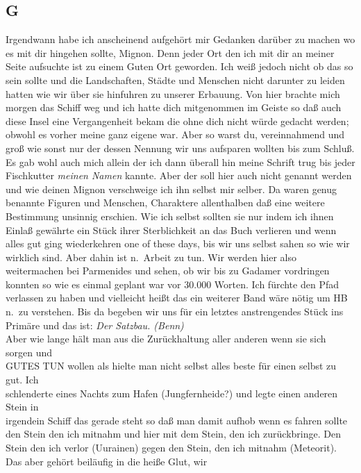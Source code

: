 \documentclass[
]{article}
\author{}
\date{\vspace{-2.5em}}
\begin{document}
\subsection{G}\label{g}

Irgendwann habe ich anscheinend aufgehört mir Gedanken darüber zu machen
wo es mit dir hingehen sollte, Mignon. Denn jeder Ort den ich mit dir an
meiner Seite aufsuchte ist zu einem Guten Ort geworden. Ich weiß jedoch
nicht ob das so sein sollte und die Landschaften, Städte und Menschen
nicht darunter zu leiden hatten wie wir über sie hinfuhren zu unserer
Erbauung. Von hier brachte mich morgen das Schiff weg und ich hatte dich
mitgenommen im Geiste so daß auch diese Insel eine Vergangenheit bekam
die ohne dich nicht würde gedacht werden; obwohl es vorher meine ganz
eigene war. Aber so warst du, vereinnahmend und groß wie sonst nur der
dessen Nennung wir uns aufsparen wollten bis zum Schluß. Es gab wohl
auch mich allein der ich dann überall hin meine Schrift trug bis jeder
Fischkutter \emph{meinen Namen} kannte. Aber der soll hier auch nicht
genannt werden und wie deinen Mignon verschweige ich ihn selbst mir
selber. Da waren genug benannte Figuren und Menschen, Charaktere
allenthalben daß eine weitere Bestimmung unsinnig erschien. Wie ich
selbst sollten sie nur indem ich ihnen Einlaß gewährte ein Stück ihrer
Sterblichkeit an das Buch verlieren und wenn alles gut ging wiederkehren
one of these days, bis wir uns selbst sahen so wie wir wirklich sind.
Aber dahin ist n.~Arbeit zu tun. Wir werden hier also weitermachen bei
Parmenides und sehen, ob wir bis zu Gadamer vordringen konnten so wie es
einmal geplant war vor 30.000 Worten. Ich fürchte den Pfad verlassen zu
haben und vielleicht heißt das ein weiterer Band wäre nötig um HB n.~zu
verstehen. Bis da begeben wir uns für ein letztes anstrengendes Stück
ins Primäre und das ist: \emph{Der Satzbau. (Benn)}\\
Aber wie lange hält man aus die Zurückhaltung aller anderen wenn sie
sich sorgen und\\
GUTES TUN wollen als hielte man nicht selbst alles beste für einen
selbst zu gut. Ich\\
schlenderte eines Nachts zum Hafen (Jungfernheide?) und legte einen
anderen Stein in\\
irgendein Schiff das gerade steht so daß man damit aufhob wenn es fahren
sollte den Stein den ich mitnahm und hier mit dem Stein, den ich
zurückbringe. Den Stein den ich verlor (Uurainen) gegen den Stein, den
ich mitnahm (Meteorit). Das aber gehört beiläufig in die heiße Glut, wir
\end{document}
